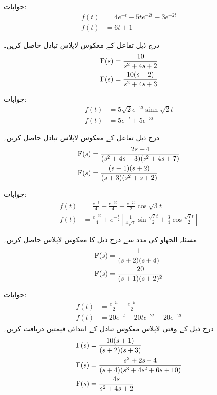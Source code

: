 جوابات:
\begin{align*}
f(t)&=4e^{-t}-5te^{-2t}-3e^{-2t}\\
f(t)&=6t+1
\end{align*}

درج ذیل تفاعل کے معکوس لاپلاس تبادل حاصل کریں۔
\begin{align*}
{\ensuremath{{\textup{F}}}}(s)&=\frac{10}{s^2+4s+2}\\
{{\textup{F}}}(s)&=\frac{10(s+2)}{s^2+4s+3}
\end{align*}

جوابات:
\begin{align*}
f(t)&=5\sqrt{2}e^{-2t}\sinh \sqrt{2}t\\
f(t)&=5e^{-t}+5e^{-3t}
\end{align*}

درج ذیل تفاعل کے معکوس لاپلاس تبادل حاصل کریں۔
\begin{align*}
{\ensuremath{{\textup{F}}}}(s)&=\frac{2s+4}{(s^2+4s+3)(s^2+4s+7)}\\
{{\textup{F}}}(s)&=\frac{(s+1)(s+2)}{(s+3)(s^2+s+2)}
\end{align*}

جوابات:
\begin{align*}
f(t)&=\frac{e^{-t}}{4}+\frac{e^{-3t}}{4}-\frac{e^{-2t}}{2}\cos \sqrt{3}t\\
f(t)&=\frac{e^{-3t}}{4}+e^{-\frac{t}{2}}\left[\frac{1}{4\sqrt{7}} \sin \frac{\sqrt{7}t}{2}+\frac{3}{4}\cos \frac{\sqrt{7}t}{2}\right]
\end{align*}

مسئلہ الجھاو کی مدد سے درج ذیل کا معکوس لاپلاس حاصل کریں۔
\begin{align*}
{\ensuremath{{\textup{F}}}}(s)&=\frac{1}{(s+2)(s+4)}\\
{{\textup{F}}}(s)&=\frac{20}{(s+1)(s+2)^2}
\end{align*} 

جوابات:
\begin{align*}
f(t)&=\frac{e^{-2t}}{2}-\frac{e^{-4t}}{2}\\
f(t)&=20e^{-t}-20te^{-2t}-20e^{-2t}
\end{align*}
درج ذیل  کے وقتی لاپلاس معکوس تبادل  کے ابتدائی قیمتیں دریافت کریں۔
\begin{align*}
{\ensuremath{{\textup{F}}}}(s)&=\frac{10(s+1)}{(s+2)(s+3)}\\
{{\textup{F}}}(s)&=\frac{s^2+2s+4}{(s+4)(s^3+4s^2+6s+10)}\\
{{\textup{F}}}(s)&=\frac{4s}{s^2+4s+2}
\end{align*}


